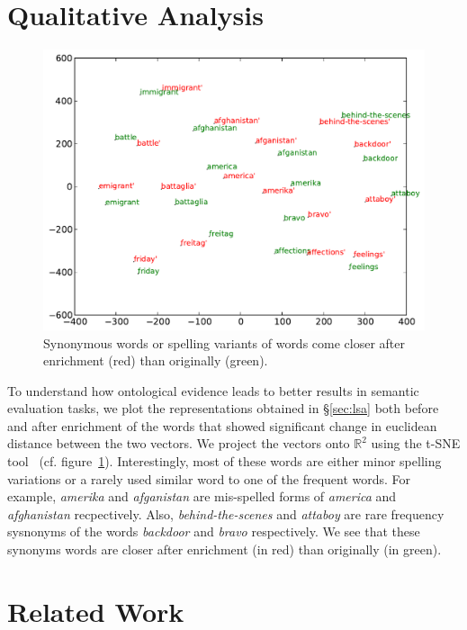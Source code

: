 \documentclass[11pt]{article}
\begin{document}
\section{Qualitative Analysis}

\begin{figure}[!tb]
  \centering
  \includegraphics[width=1.75\columnwidth]{img.pdf}
  \caption{Synonymous words or spelling variants of words come closer after enrichment (red) than originally (green).}
  \label{fig:example}
\end{figure}

To understand how ontological evidence leads to better results in semantic evaluation tasks,
we plot the representations obtained in \S\ref{sec:lsa} both before and after enrichment
of the words that showed significant change in euclidean distance between the two vectors.
We project the vectors onto $\mathbb{R}^2$ using the t-SNE tool~\cite{citeulike:3749741} (cf. figure~\ref{fig:example}). 
Interestingly, most of these words are either minor spelling variations or a rarely used similar
word to one of the frequent words. For example, \textit{amerika} and \textit{afganistan} are 
mis-spelled forms of \textit{america} and \textit{afghanistan} recpectively. Also, 
\textit{behind-the-scenes} and \textit{attaboy} are rare frequency sysnonyms of the words
\textit{backdoor} and \textit{bravo} respectively. We see that these synonyms words are
closer after enrichment (in red) than originally (in green).  


\section{Related Work}
\end{document}
